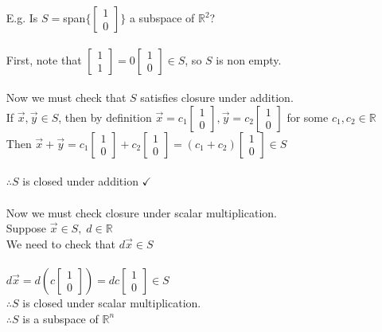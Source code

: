 \documentclass{letter}
\newcommand{\0}[1]{\begin{bmatrix}#1\end{bmatrix}}
\begin{document}
	\begin{itemize}
		\item[E.g.] Is $S = $span$\{ \0{1\\0 }\}$ a subspace  of $\mathbb{R}^2$?\\\\
		First, note that $\0{1\\1} = 0\0{1\\0} \in S$, so $S$ is non empty.\\\\
		Now we must check that $S$ satisfies closure under addition.\\
		If $\vec x, \vec y \in S$, then by definition $\vec x = c_1\0{1\\0}, \vec y = c_2\0{1\\0}$ for some $c_1, c_2 \in \mathbb{R}$\\
		Then $\vec x + \vec y = c_1\0{1\\0} + c_2\0{1\\0} = (c_1+c_2)\0{1\\0} \in S$\\\\
		$\therefore S$ is closed under addition $\checkmark$\\\\
		Now we must check closure under scalar multiplication.\\
		Suppose $\vec x \in S,\;d \in \mathbb{R}$\\
		We need to check that $d\vec x \in S$\\\\
		$d\vec x = d(c\0{1\\0}) = dc\0{1\\0} \in S$\\
		$\therefore S$ is closed under scalar multiplication.\\
		$\therefore S$ is a subspace of $\mathbb{R}^n$\\
		

\end{itemize}
\end{document}
